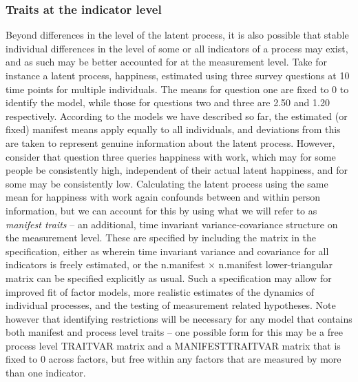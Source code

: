 \documentclass[nojss]{jss}\usepackage[]{graphicx}\usepackage[]{color}
\begin{document}
\subsubsection{Traits at the indicator level} \label{sec:manifesttraits}\nopagebreak
Beyond differences in the level of the latent process, it is also possible that stable individual differences in the level of some or all indicators of a process may exist, and as such may be better accounted for at the measurement level. Take for instance a latent process, happiness, estimated using three survey questions at 10 time points for multiple individuals. The means for question one are fixed to 0 to identify the model, while those for questions two and three are 2.50 and 1.20 respectively.  According to the models we have described so far, the estimated (or fixed) manifest means apply equally to all individuals, and deviations from this are taken to represent genuine information about the latent process. However, consider that question three queries happiness with work, which may for some people be consistently high, independent of their actual latent happiness, and for some may be consistently low. Calculating the latent process using the same mean for happiness with work again confounds between and within person information, but we can account for this by using what we will refer to as \textit{manifest traits} -- an additional, time invariant variance-covariance structure on the measurement level. These are specified by including the  matrix in the  specification, either as  wherein time invariant variance and covariance for all indicators is freely estimated, or the n.manifest $ \times $ n.manifest lower-triangular matrix can be specified explicitly as usual. Such a specification may allow for improved fit of factor models, more realistic estimates of the dynamics of individual processes, and the testing of measurement related hypotheses. Note however that identifying restrictions will be necessary for any model that contains both manifest and process level traits -- one possible form for this may be a free process level TRAITVAR matrix and a MANIFESTTRAITVAR matrix that is fixed to 0 across factors, but free within any factors that are measured by more than one indicator.
\end{document}
